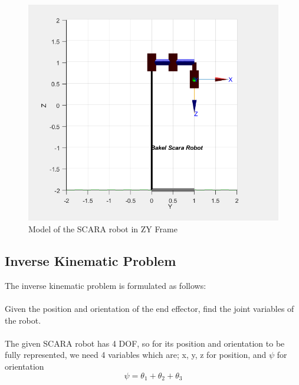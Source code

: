 \documentclass[12pt]{report}
\begin{document}
\begin{figure}[H]
	\centering
	\includegraphics[scale=1]{run5} %
	\caption{Model of the SCARA robot in ZY Frame}
	\label{run5} %
\end{figure}

	\subsection{Inverse Kinematic Problem}
	
	The inverse kinematic problem is formulated as follows: \\\\Given the position and orientation of the end effector, find the joint variables of the robot. \\\\The given SCARA robot has 4 DOF, so for its position and orientation to be fully represented, we need 4 variables which are; x, y, z for position, and \(\psi\) for orientation 
	\begin{equation}
		\psi=\theta_1+\theta_2+\theta_3
	\end{equation}
\end{document}
